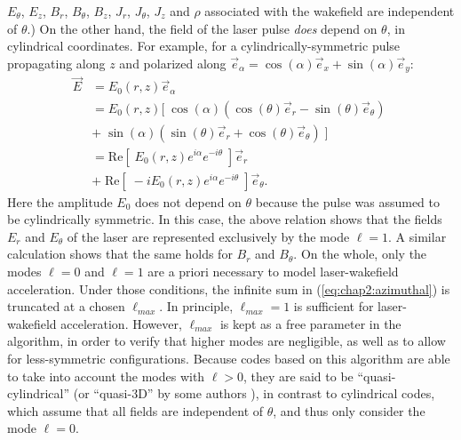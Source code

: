 \documentclass[]{report}
\begin{document}
$E_\theta$, $E_z$, $B_r$, $B_\theta$, $B_z$, $J_r$, $J_\theta$, $J_z$
and $\rho$ associated with the
wakefield are independent of $\theta$.) On the other hand, the field
of the laser pulse \emph{does}
depend on $\theta$, in cylindrical coordinates. For example, for a
cylindrically-symmetric pulse propagating along $z$ and polarized along $\vec{e}_\alpha = \cos(\alpha)\vec{e}_x + \sin(\alpha)\vec{e}_y$:
%
\begin{align}
\vec{E} &= E_0(r,z)\vec{e}_\alpha \\
& = E_0(r,z) [\; \cos(\alpha)(\cos(\theta)\vec{e}_r - \sin(\theta)\vec{e}_\theta) \; \nonumber \\
& + \; \sin(\alpha)(\sin(\theta)\vec{e}_r + \cos(\theta)\vec{e}_\theta) \; ]\\
& = \mathrm{Re}[ \; E_0(r,z) e^{i\alpha} e^{-i\theta} \; ]\vec{e}_r \; \nonumber \\
& + \; \mathrm{Re}[ \; -i E_0(r,z) e^{i\alpha} e^{-i\theta} \; ]\vec{e}_\theta.
\end{align}
%
Here the amplitude $E_0$ does not depend on $\theta$ because the pulse was assumed
to be cylindrically symmetric. In this case, the above relation shows
that the fields $E_r$ and $E_\theta$ of the laser are represented
exclusively by the mode $\ell = 1$. A similar calculation shows that
the same holds for $B_r$ and $B_\theta$. On the whole, only the modes
$\ell = 0$ and $\ell = 1$ are a priori necessary to model
laser-wakefield acceleration.
Under those conditions, the infinite sum in
(\ref{eq:chap2:azimuthal}) is truncated at a chosen $\ell_{max}$. In
principle, $\ell_{max} = 1$ is sufficient for laser-wakefield
acceleration. However, $\ell_{max}$ is kept as a free parameter in the algorithm, in order to verify that
higher modes are negligible, as well as to allow for less-symmetric configurations.
Because codes based on this algorithm are able to take into account the modes with $\ell > 0$, they are said to be
``quasi-cylindrical'' (or ``quasi-3D'' by some authors \cite{DavidsonJCP2015}), in contrast to cylindrical codes, which
assume that all fields are independent of $\theta$, and thus only
consider the mode $\ell = 0$.
\end{document}
